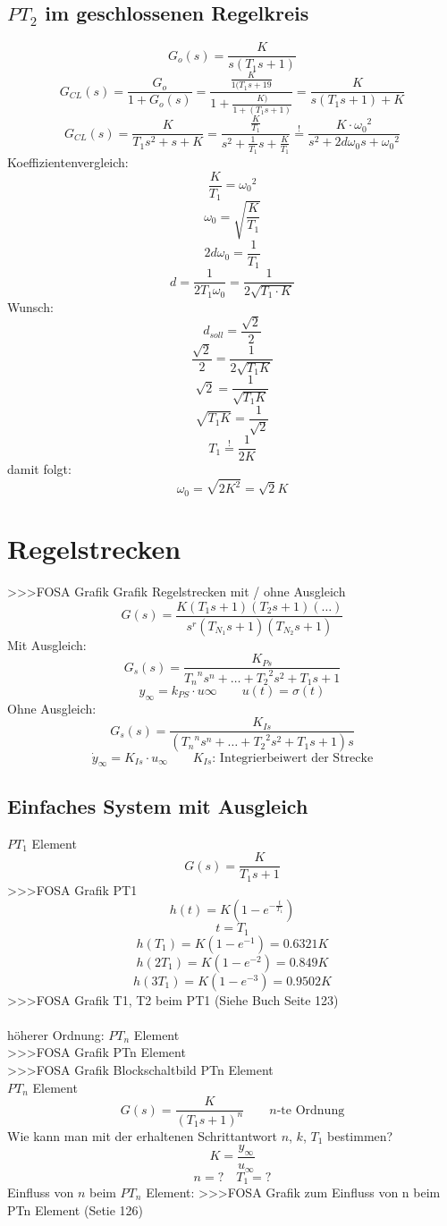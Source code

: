 \subsection{$PT_2$ im geschlossenen Regelkreis}
\[ G_o(s) = \frac{K}{s (T_1 s + 1)} \]
\[ G_{CL}(s) = \frac{G_o}{1 + G_o(s)} = \frac{\frac{K}{1 (T_1 s + 19}}{1 + \frac{K)}{1 + (T_1 s + 1)}} = \frac{K}{s (T_1 s + 1) + K} \]
\[ G_{CL}(s) = \frac{K}{T_1 s^2 + s + K} = \frac{\frac{K}{T_1}}{s^2 + \frac{1}{T_1} s + \frac{K}{T_1}} \stackrel{!}{=} \frac{K \cdot {\omega_0}^2}{s^2 + 2 d \omega_0 s + {\omega_0}^2} \]
Koeffizientenvergleich:
\[ \frac{K}{T_1} = {\omega_0}^2 \]
\[ \omega_0 = \sqrt{\frac{K}{T_1}} \]
\[ 2 d \omega_0 = \frac{1}{T_1} \]
\[ d = \frac{1}{2 T_1 \omega_0} = \frac{1}{2 \sqrt{T_1 \cdot K}} \]
Wunsch: 
\[ d_{soll} = \frac{\sqrt{2}}{2} \]
\[ \frac{\sqrt{2}}{2} = \frac{1}{2 \sqrt{T_1 K}} \]
\[ \sqrt{2} = \frac{1}{\sqrt{T_1 K}} \]
\[ \sqrt{T_1 K} = \frac{1}{\sqrt{2}} \]
\[ T_1 \stackrel{!}{=} \frac{1}{2 K} \]
damit folgt:
\[ \omega_0 = \sqrt{2 K^2} = \sqrt{2} K \]

\section{Regelstrecken}
>>>FOSA Grafik Grafik Regelstrecken mit / ohne Ausgleich
\[ G(s) = \frac{K (T_1 s + 1) (T_2 s + 1) (\ldots)}{s^r (T_{N_1} s + 1) (T_{N_2} s + 1)} \]
Mit Ausgleich: 
\[ G_s(s) = \frac{K_{Ps}}{{T_n}^n s^n + \ldots + {T_2}^2 s^2 + T_1 s + 1} \]
\[ y_\infty = k_{PS} \cdot u\infty \qquad u(t) = \sigma(t) \]
Ohne Ausgleich: 
\[ G_s(s) = \frac{K_{Is}}{({T_n}^n s^n + \ldots + {T_2}^2 s^2 + T_1 s + 1) s} \]
\[ \dot{y}_\infty = K_{Is} \cdot u_\infty \qquad \text{$K_{Is}$: Integrierbeiwert der Strecke} \]

\subsection{Einfaches System mit Ausgleich}
$PT_1$ Element
\[ G(s) = \frac{K}{T_1 s + 1} \]
>>>FOSA Grafik PT1
\[ h(t) = K \left(1 - e^{-\frac{t}{T_1}}\right) \]
\[ t = T_1 \]
\[ h(  T_1) = K \left( 1 - e^{-1} \right) = 0.6321 K \]
\[ h(2 T_1) = K \left( 1 - e^{-2} \right) = 0.849 K \]
\[ h(3 T_1) = K \left( 1 - e^{-3} \right) = 0.9502 K \]
>>>FOSA Grafik T1, T2 beim PT1 (Siehe Buch Seite 123)
\\\\
höherer Ordnung: $PT_n$ Element\\
>>>FOSA Grafik PTn Element\\
>>>FOSA Grafik Blockschaltbild PTn Element\\
$PT_n$ Element
\[ G(s) = \frac{K}{(T_1 s + 1)^n} \qquad \text{$n$-te Ordnung} \]
Wie kann man mit der erhaltenen Schrittantwort $n$, $k$, $T_1$ bestimmen? 
\[ K = \frac{y_\infty}{u_\infty} \]
\[ n = ? \quad T_1 = ? \]
Einfluss von $n$ beim $PT_n$ Element: 
>>>FOSA Grafik zum Einfluss von n beim PTn Element (Setie 126)

